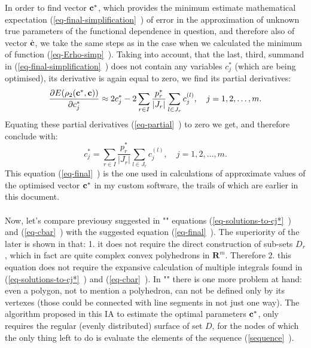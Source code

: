 In order to find vector $\textbf{c}^{*}$, which provides the minimum estimate mathematical expectation (\vref{eq-final-simplification}~) of error in the approximation of unknown true parameters of the functional dependence in question, and therefore also of vector $\dot{\textbf{c}}$, we take the same steps as in the case when we calculated the minimum of function (\vref{eq-Erho-simp}~). Taking into account, that the last, third, summand in (\vref{eq-final-simplification}~) does not contain 
any variables $c_{j}^{*}$ (which are being optimised), its derivative is again equal to zero, we find its partial derivatives:
\begin{equation}
\frac{\partial E (\rho_{2}(\textbf{c}^{*},\textbf{c}))}{\partial c_{j}^{*}} \approx 2c_{j}^{*} - 2 \sum\limits_{r \in I} \frac{p_{r}^{*}}{\left| J_{r} \right|} \sum\limits_{l \in J_{r}} c_{j}^{(l)}, \quad j=1,2,\dots,m. \label{eq-partial}
\end{equation}
Equating these partial derivatives (\vref{eq-partial}~) to zero we get, and therefore conclude with:
\begin{equation}
c_{j}^{*} = \sum\limits_{r \in I} \frac{p_{r}^{*}}{\left| J_{r} \right|} \sum\limits_{l \in J_{r}} c_{j}^{(l)}, \quad j=1,2,\dots,m. \label{eq-final}
\end{equation}
This equation (\vref{eq-final}~) is the one used in calculations of approximate values of the optimised vector $\textbf{c}^{*}$ in my custom software, the trails of which are earlier  in this document.\\
\\
Now, let's compare previousy suggested in "\cite{balk_2010}" equations (\vref{eq-solutions-to-cj*}~) and (\vref{eq-cbar}~) with the suggested equation (\vref{eq-final}~). The superiority of the later is shown in that: 1. it does not require the direct construction of sub-sets $D_{r}$
, which in fact are quite complex convex polyhedrons in $\boldsymbol{R}^{m}$. Therefore 2. this equation does not require the expansive calculation of multiple integrals found in (\vref{eq-solutions-to-cj*}~) and (\vref{eq-cbar}~).  In "\cite{balk_2010}" there is one more problem at hand: even a polygon, not to mention a polyhedron, can not be defined only by its vertexes (those could be connected with line segments in not just one way). The algorithm proposed in this IA to estimate the optimal parameters $\textbf{c}^{*}$, only requires the regular (evenly distributed) surface of set $D$, for the nodes of which the only thing left to do is evaluate the elements of the sequence (\vref{sequence}~).

\newpage






